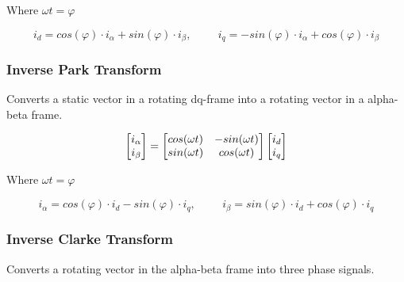 Where
$\omega t = \varphi$

\begin{equation}
    i_{d} = cos(\varphi) \cdot i_{\alpha} + sin(\varphi) \cdot i_{\beta}
    , \hspace{1cm}
    i_{q} = -sin(\varphi) \cdot i_{\alpha} + cos(\varphi) \cdot i_{\beta}
    \label{eq:park_transformation}
\end{equation}


\subsubsection{Inverse Park Transform}
Converts a static vector in a rotating dq-frame into a rotating vector in a alpha-beta frame.

\begin{equation}
    \centering
    \begin{bmatrix}
        i_{\alpha} \\ 
        i_{\beta}
    \end{bmatrix}
    =
    \begin{bmatrix}
       cos(\omega t) & -sin(\omega t) \\
       sin(\omega t) & cos(\omega t)
    \end{bmatrix}
    \begin{bmatrix}
        i_{d} \\ 
        i_{q}
    \end{bmatrix}
\end{equation}

Where
$\omega t = \varphi$

\begin{equation}
    i_{\alpha} = cos(\varphi) \cdot i_{d} - sin(\varphi) \cdot i_{q}
    , \hspace{1cm}
    i_{\beta} = sin(\varphi) \cdot i_{d} + cos(\varphi) \cdot i_{q}
    \label{eq:inverse_park_transformation}
\end{equation}

\subsubsection{Inverse Clarke Transform}
Converts a rotating vector in the alpha-beta frame into three phase signals. 


